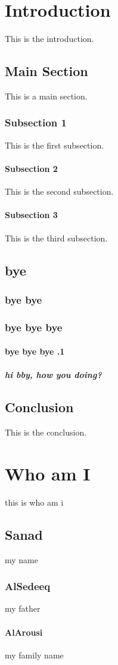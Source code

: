 \documentclass[a4paper,12pt]{book}
\begin{document}
	\chapter{Introduction}
	This is the introduction.
	
	\section{Main Section}
	This is a main section.
	
	\subsection{Subsection 1}
	This is the first subsection.
	
	\subsubsection{Subsection 2}
	This is the second subsection.
	
	\subsubsection{Subsection 3}
	This is the third subsection.
	
	\section{bye}
	
	\subsection{bye bye}
	
	\subsection{bye bye bye}
	\subsubsection{bye bye bye .1}
	\paragraph{
	hi bby, how you doing?
	}
	
	\section{Conclusion}
	This is the conclusion.
	
	\chapter{Who am I}
	this is who am i
	
	\section{Sanad}
	my name
	\subsection{AlSedeeq}
	my father
	\subsubsection{AlArousi}
	my family name
\end{document}
